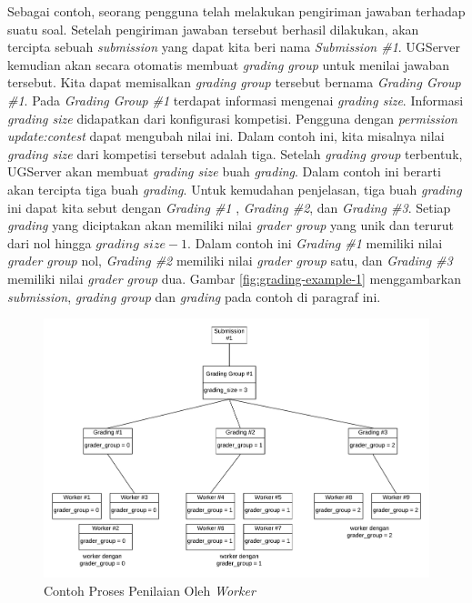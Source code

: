 \par Sebagai contoh, seorang pengguna telah melakukan pengiriman jawaban terhadap suatu soal. Setelah pengiriman jawaban tersebut berhasil dilakukan, akan tercipta sebuah \textit{submission} yang dapat kita beri nama \textit{Submission \#1}. UGServer kemudian akan secara otomatis membuat \textit{grading group} untuk menilai jawaban tersebut. Kita dapat memisalkan \textit{grading group} tersebut bernama \textit{Grading Group \#1}. Pada \textit{Grading Group \#1} terdapat informasi mengenai \textit{grading size}. Informasi \textit{grading size} didapatkan dari konfigurasi kompetisi. Pengguna dengan \textit{permission update:contest} dapat mengubah nilai ini. Dalam contoh ini, kita misalnya nilai \textit{grading size} dari kompetisi tersebut adalah tiga. Setelah \textit{grading group} terbentuk, UGServer akan membuat \textit{grading size} buah \textit{grading}. Dalam contoh ini berarti akan tercipta tiga buah \textit{grading}. Untuk kemudahan penjelasan, tiga buah \textit{grading} ini dapat kita sebut dengan \textit{Grading \#1} , \textit{Grading \#2}, dan \textit{Grading \#3}. Setiap \textit{grading} yang diciptakan akan memiliki nilai \textit{grader group} yang unik dan terurut dari nol hingga $\textit{grading size} - 1$. Dalam contoh ini \textit{Grading \#1} memiliki nilai \textit{grader group} nol, \textit{Grading \#2} memiliki nilai \textit{grader group} satu, dan \textit{Grading \#3} memiliki nilai \textit{grader group} dua. Gambar \ref{fig:grading-example-1} menggambarkan \textit{submission}, \textit{grading group} dan \textit{grading} pada contoh di paragraf ini.

\begin{figure}[ht!]
    \centering
    \includegraphics[width=\textwidth]{images/grading-example-2}
    \caption{Contoh Proses Penilaian Oleh \textit{Worker}}
    \label{fig:grading-example-2}
\end{figure}

